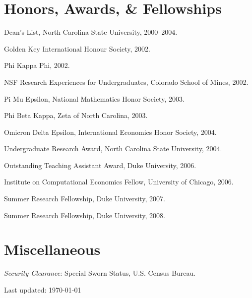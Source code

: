 \documentclass[10pt,letterpaper]{article}
\renewenvironment{itemize}{
  \begin{list}{}{
    \setlength{\leftmargin}{1.5em}
    \setlength{\itemsep}{0.25em}
    \setlength{\parskip}{0pt}
    \setlength{\parsep}{0.25em}
  }
}{
  \end{list}
}
\begin{document}
\section*{Honors, Awards, \& Fellowships}

\begin{itemize}

\item Dean's List, North Carolina State University, 2000--2004.

\item Golden Key International Honour Society, 2002.

\item Phi Kappa Phi, 2002.

\item NSF Research Experiences for Undergraduates,
  Colorado School of Mines, 2002.

\item Pi Mu Epsilon, National Mathematics Honor Society, 2003.

\item Phi Beta Kappa, Zeta of North Carolina, 2003.

\item Omicron Delta Epsilon, International Economics Honor Society, 2004.

\item Undergraduate Research Award, North Carolina State University, 2004.

\item Outstanding Teaching Assistant Award, Duke University, 2006.

\item Institute on Computational Economics
  Fellow, University of Chicago, 2006.

\item Summer Research Fellowship, Duke University, 2007.

\item Summer Research Fellowship, Duke University, 2008.

\end{itemize}

\section*{Miscellaneous}

\begin{itemize}

  \item \textit{Security Clearance:} Special Sworn Status, U.S. Census Bureau.

\end{itemize}

\bigskip

\begin{center}
  \begin{small}
    Last updated: \today
  \end{small}
\end{center}
\end{document}
